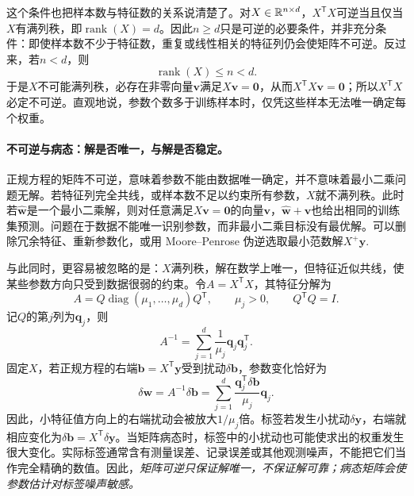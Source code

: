 这个条件也把样本数与特征数的关系说清楚了。对$X\in\mathbb{R}^{n\times d}$，$X^{\mathsf T}X$可逆当且仅当$X$有满列秩，即$\operatorname{rank}(X)=d$。因此$n\geq d$只是可逆的必要条件，并非充分条件：即使样本数不少于特征数，重复或线性相关的特征列仍会使矩阵不可逆。反过来，若$n<d$，则
\begin{equation}
 \operatorname{rank}(X)\leq n<d.
\end{equation}
于是$X$不可能满列秩，必存在非零向量$\bm v$满足$X\bm v=\bm0$，从而$X^{\mathsf T}X\bm v=\bm0$；所以$X^{\mathsf T}X$必定不可逆。直观地说，参数个数多于训练样本时，仅凭这些样本无法唯一确定每个权重。

\paragraph{不可逆与病态：解是否唯一，与解是否稳定。}
正规方程的矩阵不可逆，意味着参数不能由数据唯一确定，并不意味着最小二乘问题无解。若特征列完全共线，或样本数不足以约束所有参数，$X$就不满列秩。此时若$\hat{\bm w}$是一个最小二乘解，则对任意满足$X\bm v=\bm0$的向量$\bm v$，$\hat{\bm w}+\bm v$也给出相同的训练集预测。问题在于数据不能唯一识别参数，而非最小二乘目标没有最优解。可以删除冗余特征、重新参数化，或用 Moore--Penrose 伪逆选取最小范数解$X^+\bm y$.

与此同时，更容易被忽略的是：$X$满列秩，解在数学上唯一，但特征近似共线，使某些参数方向只受到数据很弱的约束。令$A=X^{\mathsf T}X$，其特征分解为
\begin{equation}
 A=Q\operatorname{diag}(\mu_1,\ldots,\mu_d)Q^{\mathsf T},
 \qquad \mu_j>0,\qquad Q^{\mathsf T}Q=I.
\end{equation}
记$Q$的第$j$列为$\bm q_j$，则
\begin{equation}
 A^{-1}=\sum_{j=1}^d\frac1{\mu_j}\bm q_j\bm q_j^{\mathsf T}.
\end{equation}
固定$X$，若正规方程的右端$\bm b=X^{\mathsf T}\bm y$受到扰动$\delta\bm b$，参数变化恰好为
\begin{equation}
 \delta\bm w=A^{-1}\delta\bm b
 =\sum_{j=1}^d\frac{\bm q_j^{\mathsf T}\delta\bm b}{\mu_j}\bm q_j.
 \label{eq:linear-ill-conditioned-perturbation}
\end{equation}
因此，小特征值方向上的右端扰动会被放大$1/\mu_j$倍。标签若发生小扰动$\delta\bm y$，右端就相应变化为$\delta\bm b=X^{\mathsf T}\delta\bm y$。当矩阵病态时，标签中的小扰动也可能使求出的权重发生很大变化。实际标签通常含有测量误差、记录误差或其他观测噪声，不能把它们当作完全精确的数值。因此，\emph{矩阵可逆只保证解唯一，不保证解可靠；病态矩阵会使参数估计对标签噪声敏感。}

